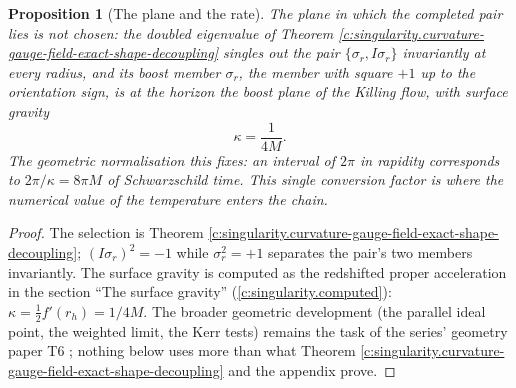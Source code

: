 \documentclass[11pt]{article}
\newtheorem{proposition}[theorem]{Proposition}
\theoremstyle{definition}
\theoremstyle{plain}
\begin{document}
\begin{proposition}[The plane and the rate]\label{c:singularity.plane-rate}
The plane in which the completed pair lies is not chosen: the doubled eigenvalue of Theorem \ref{c:singularity.curvature-gauge-field-exact-shape-decoupling} singles out the pair $\{\sigma_r, I\sigma_r\}$ invariantly at every radius, and its boost member $\sigma_r$, the member with square $+1$ up to the orientation sign, is at the horizon the boost plane of the Killing flow, with surface gravity
\[
\kappa = \frac{1}{4M} .
\]
The geometric normalisation this fixes: an interval of $2\pi$ in rapidity corresponds to $2\pi/\kappa = 8\pi M$ of Schwarzschild time. This single conversion factor is where the numerical value of the temperature enters the chain.
\end{proposition}
\begin{proof}
The selection is Theorem \ref{c:singularity.curvature-gauge-field-exact-shape-decoupling}; $(I\sigma_r)^2 = -1$ while $\sigma_r^2 = +1$ separates the pair's two members invariantly. The surface gravity is computed as the redshifted proper acceleration in the section ``The surface gravity'' (\ref{c:singularity.computed}): $\kappa = \tfrac12 f'(r_h) = 1/4M$. The broader geometric development (the parallel ideal point, the weighted limit, the Kerr tests) remains the task of the series' geometry paper T6 \cite{ButlerT6}; nothing below uses more than what Theorem \ref{c:singularity.curvature-gauge-field-exact-shape-decoupling} and the appendix prove.

\end{proof}
\end{document}
